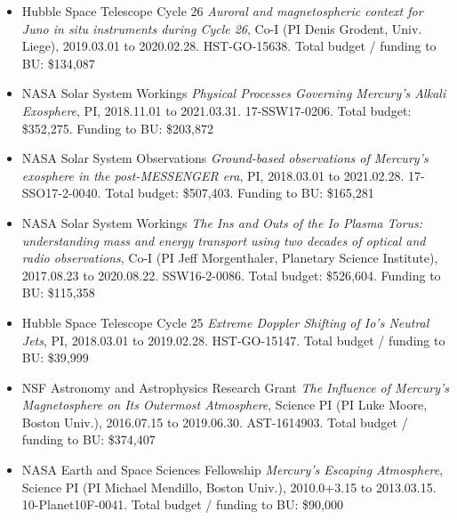 \documentclass[12pt]{report}
\begin{document}
\begin{itemize}
 \item Hubble Space Telescope Cycle 26 {\it Auroral and magnetospheric context for Juno in situ instruments during Cycle 26}, Co-I (PI Denis Grodent, Univ. Liege), 2019.03.01 to 2020.02.28. HST-GO-15638. Total budget / funding to BU: \$134,087
 \item NASA Solar System Workings  {\it Physical Processes Governing Mercury's Alkali Exosphere}, PI, 2018.11.01 to 2021.03.31. 17-SSW17-0206. Total budget: \$352,275. Funding to BU: \$203,872
 \item NASA Solar System Observations {\it Ground-based observations of Mercury's exosphere in the post-MESSENGER era}, PI, 2018.03.01 to 2021.02.28. 17-SSO17-2-0040. Total budget: \$507,403. Funding to BU: \$165,281
 \item NASA Solar System Workings {\it The Ins and Outs of the Io Plasma Torus: understanding mass and energy transport using two decades of optical and radio observations}, Co-I (PI Jeff Morgenthaler, Planetary Science Institute), 2017.08.23 to 2020.08.22. SSW16-2-0086. Total budget: \$526,604. Funding to BU: \$115,358
 \item Hubble Space Telescope Cycle 25 {\it Extreme Doppler Shifting of Io's Neutral Jets}, PI, 2018.03.01 to 2019.02.28. HST-GO-15147. Total budget / funding to BU: \$39,999
 \item NSF Astronomy and Astrophysics Research Grant {\it The Influence of Mercury's Magnetosphere on Its Outermost Atmosphere}, Science PI (PI Luke Moore, Boston Univ.), 2016.07.15 to 2019.06.30. AST-1614903. Total budget / funding to BU: \$374,407
 \item NASA Earth and Space Sciences Fellowship {\it Mercury's Escaping Atmosphere}, Science PI (PI Michael Mendillo, Boston Univ.), 2010.0+3.15 to 2013.03.15. 10-Planet10F-0041. Total budget / funding to BU: \$90,000
 \end{itemize}
\vspace{2 mm}
\end{document}
